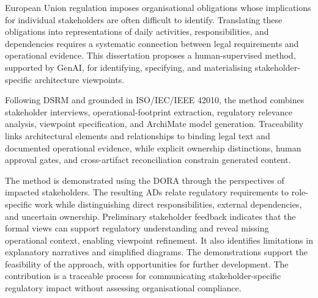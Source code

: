\acresetall

\begingroup
\singlespacing
\setlength{\parskip}{8pt}
\setlength{\parindent}{1.5em}

\noindent European Union regulation imposes organisational obligations whose implications for individual stakeholders are often difficult to identify. Translating these obligations into representations of daily activities, responsibilities, and dependencies requires a systematic connection between legal requirements and operational evidence. This dissertation proposes a human-supervised method, supported by \ac{GenAI}, for identifying, specifying, and materialising stakeholder-specific architecture viewpoints.

Following \ac{DSRM} and grounded in ISO/IEC/IEEE 42010, the method combines stakeholder interviews, operational-footprint extraction, regulatory relevance analysis, viewpoint specification, and ArchiMate model generation. Traceability links architectural elements and relationships to binding legal text and documented operational evidence, while explicit ownership distinctions, human approval gates, and cross-artifact reconciliation constrain generated content.

The method is demonstrated using the \ac{DORA} through the perspectives of impacted stakeholders. The resulting \ac{AD}s relate regulatory requirements to role-specific work while distinguishing direct responsibilities, external dependencies, and uncertain ownership. Preliminary stakeholder feedback indicates that the formal views can support regulatory understanding and reveal missing operational context, enabling viewpoint refinement. It also identifies limitations in explanatory narratives and simplified diagrams. The demonstrations support the feasibility of the approach, with opportunities for further development. The contribution is a traceable process for communicating stakeholder-specific regulatory impact without assessing organisational compliance.

\endgroup
